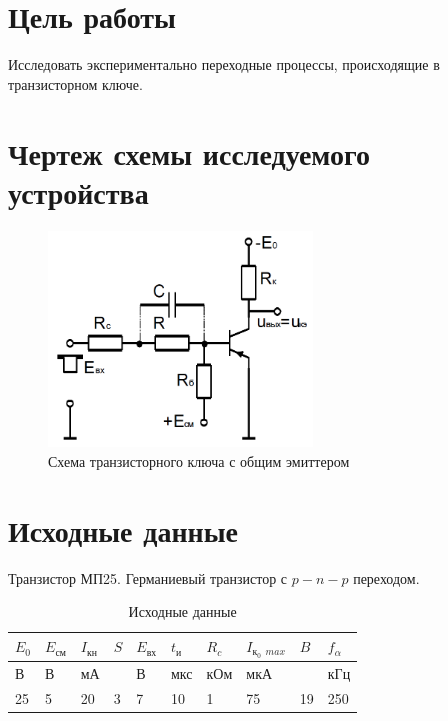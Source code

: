 





\section{Цель работы}

Исследовать экспериментально переходные процессы, происходящие в транзисторном ключе.

\section{Чертеж схемы исследуемого устройства}

\begin{figure}[H]
	\begin{center}
	\vspace{-0.5cm}
		\includegraphics[width=7cm]{img/scheme}
		\caption{Схема транзисторного ключа с общим эмиттером}
		\label{figure:1}
	\vspace{-0.5cm}
	\end{center}
\end{figure}

\section{Исходные данные}

Транзистор МП25. Германиевый транзистор с $p-n-p$ переходом.

\begin{table}[H]
	\begin{center}
	\caption{Исходные данные}
	\def\arraystretch{1.4}
		\begin{tabularx}{\textwidth}{|X|X|X|X|X|X|X|X|X|X|}
			\hline
			$E_0$ &
			$E_\text{см}$ &
			$I_\text{кн}$ &
			$S$ &
			$E_\text{вх}$ &
			$t_\text{и}$ &
			$R_c$ &
			$I_{\text{к}_0\ \ max}$ &
			$B$ &
			$f_\alpha$\\
			\hline
			В &
			В &
			мА &
			 &
			В &
			мкс &
			кОм &
			мкА &
			 &
			кГц\\
			\hline
			25 &
			5 &
			20 &
			3 &
			7 &
			10 &
			1 &
			75 &
			19 &
			250 \\
		    \hline	
		\end{tabularx}
		\label{tabular:1}
	\end{center}
\end{table}

